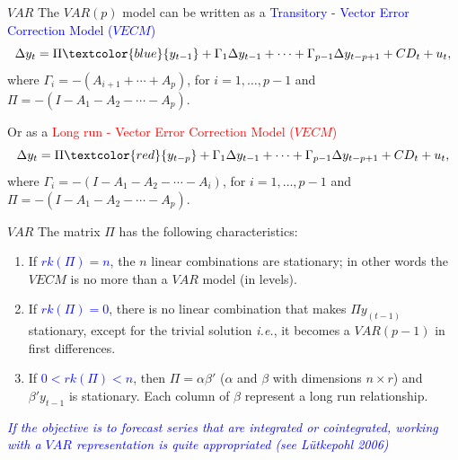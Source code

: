 \documentclass{beamer}
\newcommand{\?}{?`}
\begin{document}
\begin{frame}{$VAR$}
  The $VAR(p)$ model can be written as a  \textcolor{blue}{Transitory - Vector Error Correction Model ($VECM$)}
  \begin{displaymath}
    \Delta y_{t}=\Pi  \textcolor{blue}{ y_{t-1}}+\Gamma_1 \Delta y_{t-1} + \cdots +
    \Gamma_{p-1} \Delta y_{t-p+1} + CD_t + u_t,
  \end{displaymath}
  where $\Gamma_i=-(A_{i+1}+\cdots + A_p)$, for $i=1,\ldots ,p-1$ and
  $\Pi=-(I-A_1-A_2-\cdots - A_p)$.

\bigskip

  Or as a  \textcolor{red}{Long run - Vector Error Correction Model ($VECM$)}
  \begin{displaymath}
    \Delta y_t=\Pi \textcolor{red}{ y_{t-p}}+\Gamma_1 \Delta y_{t-1} + \cdots +
    \Gamma_{p-1} \Delta y_{t-p+1} + CD_t + u_t,
  \end{displaymath}
  where $\Gamma_i=-(I-A_{1}-A_2-\cdots -A_i)$, for $i=1,\ldots ,p-1$
  and $\Pi=-(I-A_1-A_2-\cdots - A_p)$.
\end{frame}


\begin{frame}{$VAR$}
  The matrix $\Pi$ has the following characteristics:
  \begin{enumerate}
  \item  If \textcolor{blue}{$rk(\Pi)=n$},  the $n$ linear combinations are stationary;
  in other words the $VECM$ is no more than a $VAR$ model (in levels).
  \item  If \textcolor{blue}{$rk(\Pi)=0$}, there is no linear combination that makes $\Pi y_{(t-1)}$ stationary,
  except for the trivial solution  {\it{i.e.}}, it becomes a $VAR(p-1)$ in first differences.
    \item  If \textcolor{blue}{$0<rk(\Pi)<n$}, then $\Pi=\alpha \beta'$ ($\alpha$ and $\beta$ with
    dimensions $n\times r$) and $\beta' y_{t-1}$ is stationary. Each
   column of $\beta$ represent a long run relationship.
  \end{enumerate}
\medskip
 \textcolor{blue}{ \it{If the objective is to forecast series that are integrated or cointegrated,
  working with a $VAR$ representation is quite appropriated (see L\"{u}tkepohl 2006) }}
\end{frame}
\end{document}
